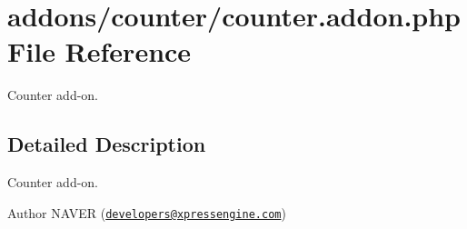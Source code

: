 \hypertarget{counter_8addon_8php}{}\section{addons/counter/counter.addon.\+php File Reference}
\label{counter_8addon_8php}


Counter add-\/on.  




\subsection{Detailed Description}
Counter add-\/on. 

\begin{DoxyAuthor}{Author}
N\+A\+V\+ER (\href{mailto:developers@xpressengine.com}{\tt developers@xpressengine.\+com}) 
\end{DoxyAuthor}
